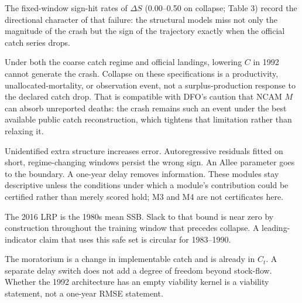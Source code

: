 \documentclass[11pt]{article}
\begin{document}
The fixed-window sign-hit rates of \(\Delta S\) (0.00--0.50 on collapse;
Table 3) record the directional character of that failure: the
structural models miss not only the magnitude of the crash but the sign
of the trajectory exactly when the official catch series drops.

Under both the coarse catch regime and official landings, lowering \(C\)
in 1992 cannot generate the crash. Collapse on these specifications is a
productivity, unallocated-mortality, or observation event, not a
surplus-production response to the declared catch drop. That is
compatible with DFO's caution that NCAM \(M\) can absorb unreported
deaths: the crash remains such an event under the best available public
catch reconstruction, which tightens that limitation rather than
relaxing it.

Unidentified extra structure increases error. Autoregressive residuals
fitted on short, regime-changing windows persist the wrong sign. An
Allee parameter goes to the boundary. A one-year delay removes
information. These modules stay descriptive unless the conditions under
which a module's contribution could be certified rather than merely
scored hold; M3 and M4 are not certificates here.

The 2016 LRP is the 1980s mean SSB. Slack to that bound is near zero by
construction throughout the training window that precedes collapse. A
leading-indicator claim that uses this safe set is circular for
1983--1990.

The moratorium is a change in implementable catch and is already in
\(C_t\). A separate delay switch does not add a degree of freedom beyond
stock-flow. Whether the 1992 architecture has an empty viability kernel
is a viability statement, not a one-year RMSE statement.
\end{document}

